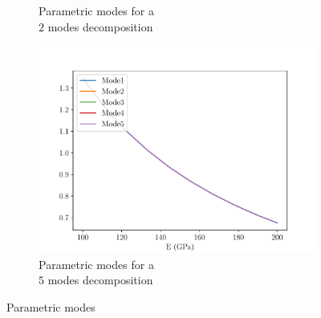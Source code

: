 \begin{figure}
\begin{subfigure}{0.3\linewidth}
        \caption{Parametric modes for a \\$2$ modes decomposition}
    \end{subfigure}
    \begin{subfigure}{0.3\linewidth}
        \centering
        \includegraphics[width=\linewidth]{Figures/Para_modes5.pdf}
        \caption{Parametric modes for a \\$5$ modes decomposition}
    \end{subfigure}
        \caption{Parametric modes}
    \label{fig:ParaModeWeight}
\end{figure}

